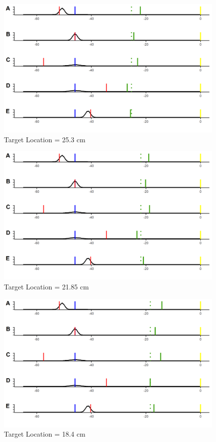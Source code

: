 \begin{figure}[h]
\centering       
    \includegraphics[width=\textwidth, keepaspectratio]{Images/bci-plots/bci_plot20-7.png}
    \caption{Target Location = 25.3 cm}
    \label{}
\end{figure}

\begin{figure}[h]
\centering       
    \includegraphics[width=\textwidth, keepaspectratio]{Images/bci-plots/bci_plot24-15.png}
    \caption{Target Location = 21.85 cm}
    \label{}
\end{figure}

\begin{figure}[h]
\centering       
    \includegraphics[width=\textwidth, keepaspectratio]{Images/bci-plots/bci_plot27.6.png}
    \caption{Target Location = 18.4 cm}
    \label{}
\end{figure}

